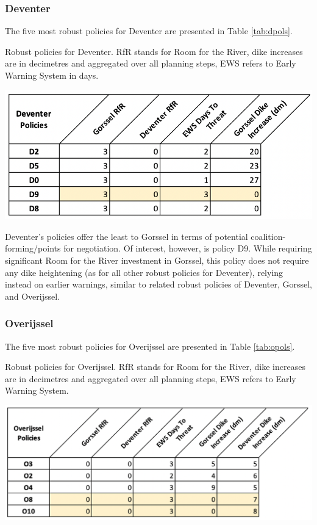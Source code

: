 \subsubsection{Deventer}
The five most robust policies for Deventer are presented in Table \ref{tab:dpols}.

\begin{table}[h!]
  \centering
  \captionsetup{justification=centering,margin=2cm}
  \caption{Robust policies for Deventer. RfR stands for Room for the River, dike increases are in decimetres and aggregated over all planning steps, EWS refers to Early Warning System in days.}
  \label{tab:dpols}
  \includegraphics[width=0.8\linewidth]{report/figures/dpols.png}
\end{table}

Deventer's policies offer the least to Gorssel in terms of potential coalition-forming/points for negotiation. Of interest, however, is policy D9. While requiring significant Room for the River investment in Gorssel, this policy does not require any dike heightening (as for all other robust policies for Deventer), relying instead on earlier warnings, similar to related robust policies of Deventer, Gorssel, and Overijssel.

\subsubsection{Overijssel}
The five most robust policies for Overijssel are presented in Table \ref{tab:opols}.

\begin{table}[h!]
  \centering
  \captionsetup{justification=centering,margin=2cm}
  \caption{Robust policies for Overijssel. RfR stands for Room for the River, dike increases are in decimetres and aggregated over all planning steps, EWS refers to Early Warning System.}
  \label{tab:opols}
  \includegraphics[width=0.8\linewidth]{report/figures/opols.png}
\end{table}

